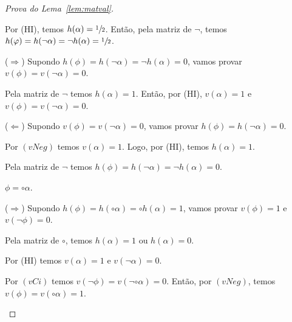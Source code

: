 \begin{proof}[Prova do Lema~\ref{lem:matval}]
\begin{provaporcasos}
\begin{provaporsubcasos}
                        Por (HI), temos $h(\alpha) = \sfrac{1}{2}{}$. Então, pela matriz de $\neg$, temos $h(\varphi) = h(\neg \alpha) = \neg h(\alpha) = \sfrac{1}{2}{}$.
                    
                        
                        ($\Longrightarrow$) Supondo $h(\phi) = h(\neg \alpha) = \neg h(\alpha) = 0$, vamos provar $v(\phi) = v(\neg \alpha) = 0$.
                        
                        Pela matriz de $\neg$ temos $h(\alpha) = 1$. Então, por (HI), $v(\alpha) = 1$ e $v(\phi) = v(\neg \alpha) = 0$.
                    
                        ($\Longleftarrow$) Supondo $v(\phi) = v(\neg \alpha) = 0$, vamos provar $h(\phi) = h(\neg \alpha) = 0$.
                    
                        Por $(vNeg)$ temos $v(\alpha) = 1$. Logo, por (HI), temos $h(\alpha) = 1$.
                        
                        Pela matriz de $\neg$ temos $h(\phi) = h(\neg \alpha) = \neg h(\alpha) = 0$.
                \end{provaporsubcasos}
                    
            \casodeprova{} $\phi = \circ \alpha$.
                    
                \begin{provaporsubcasos}
                    

                        ($\Longrightarrow$) Supondo $h(\phi) = h(\circ \alpha) = \circ h(\alpha) = 1$, vamos provar $v(\phi) = 1$ e $v(\neg \phi) = 0$.
                        
                        Pela matriz de $\circ$, temos $h(\alpha) = 1$ ou $h(\alpha) = 0$.

                        \begin{provaporsubsubcasos}
                                
                                Por (HI) temos $v(\alpha) = 1$ e $v(\neg \alpha) = 0$.
                            
                                Por $(vCi)$ temos $v(\neg \phi) = v(\neg \circ \alpha) = 0$. Então, por $(vNeg)$, temos $v(\phi) = v(\circ \alpha) = 1$.
                            

\end{provaporsubsubcasos}
\end{provaporsubcasos}
\end{provaporcasos}
\end{proof}
